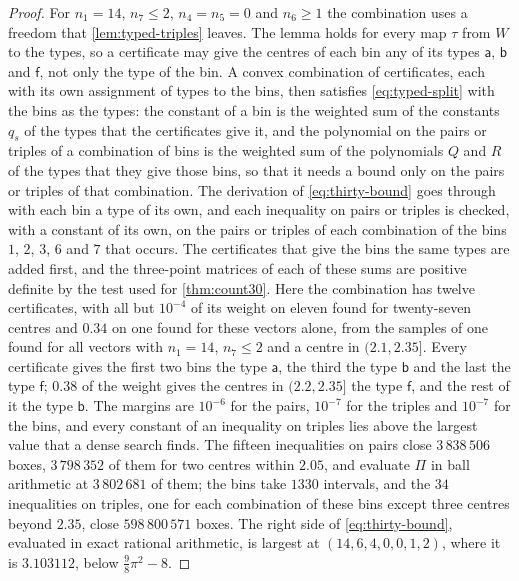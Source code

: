 \documentclass[11pt,reqno]{amsart}
\renewcommand{\_}{\origunderscore\allowbreak}
\numberwithin{equation}{section}
\theoremstyle{plain}
\theoremstyle{definition}
\theoremstyle{remark}
\begin{document}
\begin{proof}
For $n_1=14$, $n_7\le2$, $n_4=n_5=0$ and $n_6\ge1$ the combination uses a
freedom that \cref{lem:typed-triples} leaves. The lemma holds for every
map $\tau$ from $W$ to the types, so a certificate may give the centres of
each bin any of its types $\mathsf a$, $\mathsf b$ and $\mathsf f$, not
only the type of the bin. A convex combination of certificates, each with
its own assignment of types to the bins, then satisfies
\eqref{eq:typed-split} with the bins as the types: the constant of a bin
is the weighted sum of the constants $q_s$ of the types that the
certificates give it, and the polynomial on the pairs or triples of a
combination of bins is the weighted sum of the polynomials $Q$ and $R$ of
the types that they give those bins, so that it needs a bound only on the
pairs or triples of that combination. The derivation of
\eqref{eq:thirty-bound} goes through with each bin a type of its own, and
each inequality on pairs or triples is checked, with a constant of its
own, on the pairs or triples of each combination of the bins $1$, $2$,
$3$, $6$ and $7$ that occurs. The certificates that give the bins the same
types are added first, and the three-point matrices of each of these sums
are positive definite by the test used for \cref{thm:count30}. Here the
combination has twelve certificates, with all but $10^{-4}$ of its weight
on eleven found for twenty-seven centres and $0.34$ on one found for these
vectors alone, from the samples of one found for all vectors with
$n_1=14$, $n_7\le2$ and a centre in $(2.1,2.35]$. Every certificate gives
the first two bins the type $\mathsf a$, the third the type $\mathsf b$
and the last the type $\mathsf f$; $0.38$ of the weight gives the centres
in $(2.2,2.35]$ the type $\mathsf f$, and the rest of it the type
$\mathsf b$. The margins are $10^{-6}$ for the pairs, $10^{-7}$ for the
triples and $10^{-7}$ for the bins, and every constant of an inequality on
triples lies above the largest value that a dense search finds. The
fifteen inequalities on pairs close $3\,838\,506$ boxes, $3\,798\,352$ of
them for two centres within $2.05$, and evaluate $\Pi$ in ball arithmetic
at $3\,802\,681$ of them; the bins take $1330$ intervals, and the $34$
inequalities on triples, one for each combination of these bins except
three centres beyond $2.35$, close $598\,800\,571$ boxes. The right side
of \eqref{eq:thirty-bound}, evaluated in exact rational arithmetic, is
largest at $(14,6,4,0,0,1,2)$, where it is $3.103112$, below
$\frac98\pi^2-8$.


\end{proof}
\end{document}
